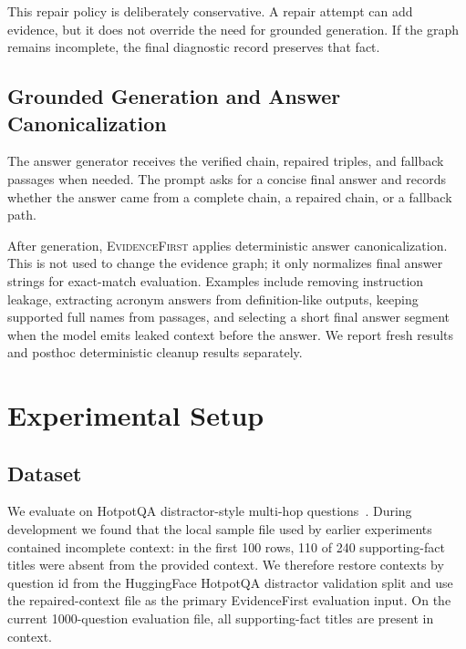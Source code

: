 \documentclass[runningheads]{llncs}
\newcommand{\sys}{\textsc{EvidenceFirst}\xspace}
\begin{document}
This repair policy is deliberately conservative. A repair attempt can add
evidence, but it does not override the need for grounded generation. If the
graph remains incomplete, the final diagnostic record preserves that fact.

\subsection{Grounded Generation and Answer Canonicalization}
\label{sec:generation}

The answer generator receives the verified chain, repaired triples, and
fallback passages when needed. The prompt asks for a concise final answer and
records whether the answer came from a complete chain, a repaired chain, or a
fallback path.

After generation, \sys applies deterministic answer canonicalization. This is
not used to change the evidence graph; it only normalizes final answer strings
for exact-match evaluation. Examples include removing instruction leakage,
extracting acronym answers from definition-like outputs, keeping supported
full names from passages, and selecting a short final answer segment when the
model emits leaked context before the answer. We report fresh results and
posthoc deterministic cleanup results separately.

\section{Experimental Setup}
\label{sec:setup_exp}

\subsection{Dataset}

We evaluate on HotpotQA distractor-style multi-hop questions~\cite{yang2018hotpotqa}. During development we found that the local sample
file used by earlier experiments contained incomplete context: in the first
100 rows, 110 of 240 supporting-fact titles were absent from the provided
context. We therefore restore contexts by question id from the HuggingFace
HotpotQA distractor validation split and use the repaired-context file as the
primary EvidenceFirst evaluation input. On the current 1000-question evaluation
file, all supporting-fact titles are present in context.
\end{document}

